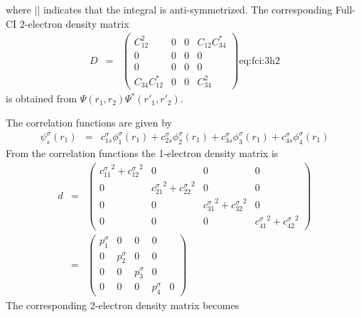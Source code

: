 \documentclass[pra,nofootinbib]{revtex4-1}
\newcommand{\dlabel}[1]{\text{#1}\label{#1}}
\begin{document}
where $||$ indicates that the integral is anti-symmetrized. 
The corresponding Full-CI 2-electron density matrix
\begin{eqnarray}
   D &=& 
   \begin{pmatrix}
   C_{12}^2     & 0 & 0 & C_{12}C^*_{34} \\
   0            & 0 & 0 & 0            \\
   0            & 0 & 0 & 0            \\
   C_{34}C^*_{12} & 0 & 0 & C_{34}^2
   \end{pmatrix}
   \dlabel{eq:fci:3h2}
\end{eqnarray}
is obtained from $\Psi(r_1,r_2)\Psi^*(r'_1,r'_2)$.

The correlation functions are given by
\begin{eqnarray}
   \psi_s^\sigma(r_1)
        &=& c^\sigma_{1s}\phi^\sigma_1(r_1)
         +  c^\sigma_{2s}\phi^\sigma_2(r_1)
         +  c^\sigma_{3s}\phi^\sigma_3(r_1)
         +  c^\sigma_{4s}\phi^\sigma_4(r_1)
\end{eqnarray}
From the correlation functions the 1-electron density matrix is
\begin{eqnarray}
   d &=&
   \begin{pmatrix}
   \left.c_{11}^\sigma\right.^2+\left.c_{12}^\sigma\right.^2 & 0 & 0 & 0 \\
   0 & \left.c_{21}^\sigma\right.^2+\left.c_{22}^\sigma\right.^2 & 0 & 0 \\
   0 & 0 & \left.c_{31}^\sigma\right.^2+\left.c_{32}^\sigma\right.^2 & 0 \\
   0 & 0 & 0 & \left.c_{41}^\sigma\right.^2+\left.c_{42}^\sigma\right.^2 
   \end{pmatrix} \\
   &=&
   \begin{pmatrix}
   p_{1}^\sigma & 0            & 0            & 0                \\
   0            & p_{2}^\sigma & 0            & 0                \\
   0            & 0            & p_{3}^\sigma & 0                \\
   0            & 0            & 0            & p_{4}^\sigma & 0 
   \end{pmatrix}
\end{eqnarray}
The corresponding 2-electron density matrix becomes
\end{document}
